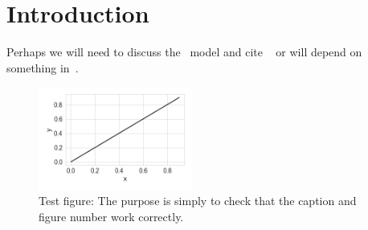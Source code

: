 \section{Introduction}
\label{sec:intro}
Perhaps we will need to discuss the \LCDM\ model and cite ~\citet{2019ApJ...873..111I} or will depend on something in~\citep{2009arXiv0912.0201L}.

\begin{figure}[!htp]
    \begin{center}
    \includegraphics[width=0.45\textwidth]{./figs/test_fig}
        \caption{Test figure: The purpose is simply to check that the caption and figure number work correctly.
    \label{fig:test_fig}
        }
    \end{center}
\end{figure}

